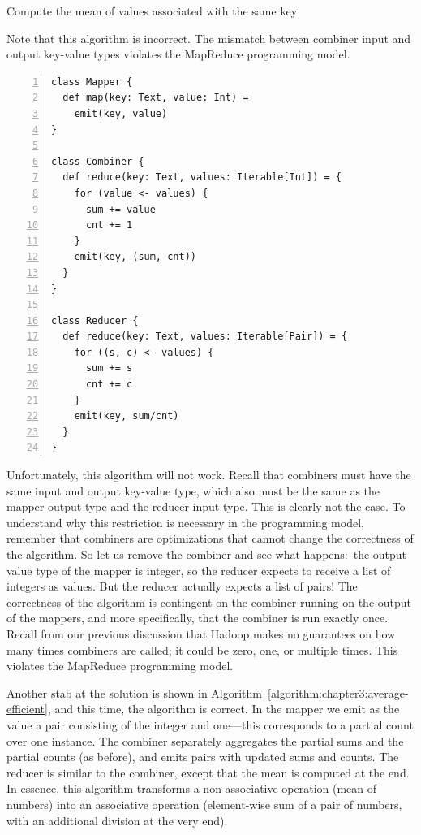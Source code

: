 \begin{algorithm}[t]
\caption{Compute the mean of values associated with the same key}
\label{algorithm:chapter3:average-fail}
Note that this algorithm is incorrect. The mismatch between
combiner input and output key-value types violates the MapReduce
programming model.
\begin{small}
\begin{Verbatim}[numbers=left, xleftmargin=7.5mm]
class Mapper {
  def map(key: Text, value: Int) =
    emit(key, value)
}

class Combiner {
  def reduce(key: Text, values: Iterable[Int]) = {
    for (value <- values) {
      sum += value
      cnt += 1
    }
    emit(key, (sum, cnt))
  }
}

class Reducer {
  def reduce(key: Text, values: Iterable[Pair]) = {
    for ((s, c) <- values) {
      sum += s
      cnt += c
    }
    emit(key, sum/cnt)
  }
}
\end{Verbatim}
\end{small}
\end{algorithm}

Unfortunately, this algorithm will not work.  Recall that combiners
must have the same input and output key-value type, which also must be
the same as the mapper output type and the reducer input type.  This
is clearly not the case.  To understand why this restriction is
necessary in the programming model, remember that combiners are
optimizations that cannot change the correctness of the algorithm.  So
let us remove the combiner and see what happens:\ the output value
type of the mapper is integer, so the reducer expects to receive a
list of integers as values.  But the reducer actually expects a list
of pairs!  The correctness of the algorithm is contingent on the
combiner running on the output of the mappers, and more specifically,
that the combiner is run exactly once.  Recall from our previous
discussion that Hadoop makes no guarantees on how many times combiners
are called; it could be zero, one, or multiple times.  This violates
the MapReduce programming model.

Another stab at the solution is shown in
Algorithm~\ref{algorithm:chapter3:average-efficient}, and this time, the
algorithm is correct.  In the mapper we emit as the value a pair
consisting of the integer and one---this corresponds to a partial
count over one instance.  The combiner separately aggregates the
partial sums and the partial counts (as before), and emits pairs with
updated sums and counts.  The reducer is similar to the combiner,
except that the mean is computed at the end.  In essence, this
algorithm transforms a non-associative operation (mean of numbers)
into an associative operation (element-wise sum of a pair of numbers,
with an additional division at the very end).


